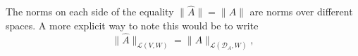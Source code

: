 \begin{remark}
  The norms on each side of the equality $\|\widehat A\|=\|A\|$
  are norms over different spaces.
  A more explicit way to note this would be to write
  \begin{equation*}
  \|\widehat A\|_{\mathcal{L}(V,W)} = \|A\|_{\mathcal{L}(\mathcal{D}_A,W)},
  \end{equation*}
\end{remark}





















